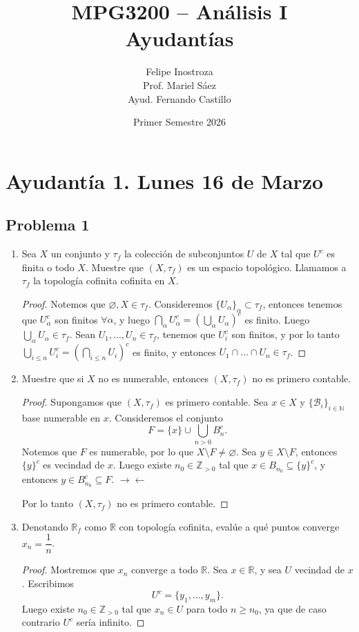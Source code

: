 \documentclass{article}
\title{MPG3200 -- Análisis I \\ Ayudantías}
\author{Felipe Inostroza \\ Prof. Mariel Sáez \\ Ayud. Fernando Castillo}
\date{Primer Semestre 2026}
\theoremstyle{definition}
\theoremstyle{remark}
\numberwithin{equation}{section}
\newcommand{\B}{\mathcal{B}}
\newcommand{\N}{\mathbb{N}}
\newcommand{\R}{\mathbb{R}}
\newcommand{\Z}{\mathbb{Z}}
\renewcommand{\a}{\alpha}
\renewcommand{\t}{\tau}
\newcommand{\br}[1]{\left( #1 \right)}
\newcommand{\ds}{\displaystyle}
\begin{document}
\maketitle
\tableofcontents

\newpage
\section{Ayudantía 1. Lunes 16 de Marzo}
\subsection{Problema 1}

\begin{enumerate}
\item Sea $X$ un conjunto y $\t_f$ la colección de subconjuntos $U$ de $X$ tal que $U^c$ es finita o todo $X$. Muestre que $(X,\t_f)$ es un espacio topológico. Llamamos a $\t_f$ la topología cofinita cofinita en $X$.
\begin{proof}
    Notemos que $\varnothing, X \in \t_f$. Consideremos $\{U_\a\}_\a \subset \t_f$, entonces tenemos que $U_\a^c$ son finitos $\forall \a$, y luego $\ds \bigcap_\a U_\a^c = \br{\bigcup_\a U_\a}^c$ es finito. Luego $\bigcup_\a U_\a \in \t_f$.
    Sean $U_1,\dots,U_n \in \t_f$, tenemos que $U_i^c$ son finitos, y por lo tanto $\bigcup_{i \leq n} U_i^c = \br{\bigcap_{i\leq n} U_i}^c$ es finito, y entonces $U_1 \cap \dots \cap U_n \in \t_f$.
\end{proof}

\item Muestre que si $X$ no es numerable, entonces $(X,\t_f)$ no es primero contable.
\begin{proof}
    Supongamos que $(X,\t_f)$ es primero contable. Sea $x \in X$ y $\{\B_i\}_{i\in\N}$ base numerable en $x$.
    Consideremos el conjunto
    \[F = \{x\} \cup \bigcup_{n>0} B_n^c.\]
    Notemos que $F$ es numerable, por lo que $X \setminus F \neq \varnothing$.
    Sea $y \in X \setminus F$, entonces $\{y\}^c$ es vecindad de $x$. Luego existe $n_0 \in \Z_{>0}$ tal que $x \in B_{n_0} \subseteq \{y\}^c$, y entonces $y \in B_{n_0}^c \subseteq F$. $\to\gets$

    Por lo tanto $(X,\t_f)$ no es primero contable.
\end{proof}

\item Denotando $\R_f$ como $\R$ con topología cofinita, evalúe a qué puntos converge $x_n = \dfrac 1n$.
\begin{proof}
    Mostremos que $x_n$ converge a todo $\R$.
    Sea $x \in \R$, y sea $U$ vecindad de $x$. Escribimos $$U^c = \{y_1,\dots,y_m\}.$$
    Luego existe $n_0 \in \Z_{>0}$ tal que $x_n \in U$ para todo $n \geq n_0$, ya que de caso contrario $U^c$ sería infinito.
\end{proof}
\end{enumerate}
\end{document}
